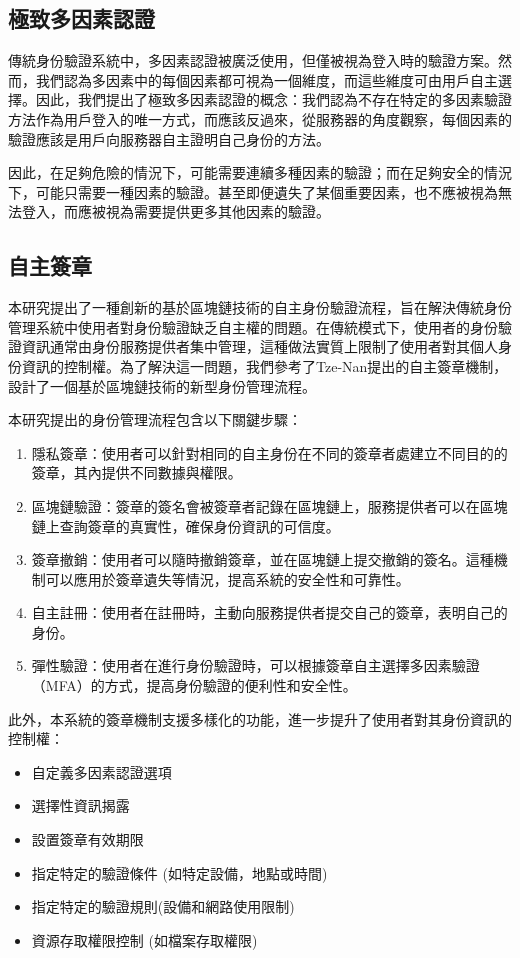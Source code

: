 \subsection{極致多因素認證}
傳統身份驗證系統中，多因素認證被廣泛使用，但僅被視為登入時的驗證方案。然而，我們認為多因素中的每個因素都可視為一個維度，而這些維度可由用戶自主選擇。因此，我們提出了極致多因素認證的概念：我們認為不存在特定的多因素驗證方法作為用戶登入的唯一方式，而應該反過來，從服務器的角度觀察，每個因素的驗證應該是用戶向服務器自主證明自己身份的方法。

因此，在足夠危險的情況下，可能需要連續多種因素的驗證；而在足夠安全的情況下，可能只需要一種因素的驗證。甚至即便遺失了某個重要因素，也不應被視為無法登入，而應被視為需要提供更多其他因素的驗證。
\subsection{自主簽章}
本研究提出了一種創新的基於區塊鏈技術的自主身份驗證流程，旨在解決傳統身份管理系統中使用者對身份驗證缺乏自主權的問題。在傳統模式下，使用者的身份驗證資訊通常由身份服務提供者集中管理，這種做法實質上限制了使用者對其個人身份資訊的控制權。為了解決這一問題，我們參考了Tze-Nan\cite{NTU202102846}提出的自主簽章機制，設計了一個基於區塊鏈技術的新型身份管理流程。

本研究提出的身份管理流程包含以下關鍵步驟：
\begin{enumerate}
  \item 隱私簽章：使用者可以針對相同的自主身份在不同的簽章者處建立不同目的的簽章，其內提供不同數據與權限。
  \item 區塊鏈驗證：簽章的簽名會被簽章者記錄在區塊鏈上，服務提供者可以在區塊鏈上查詢簽章的真實性，確保身份資訊的可信度。
  \item 簽章撤銷：使用者可以隨時撤銷簽章，並在區塊鏈上提交撤銷的簽名。這種機制可以應用於簽章遺失等情況，提高系統的安全性和可靠性。
  \item 自主註冊：使用者在註冊時，主動向服務提供者提交自己的簽章，表明自己的身份。
  \item 彈性驗證：使用者在進行身份驗證時，可以根據簽章自主選擇多因素驗證（MFA）的方式，提高身份驗證的便利性和安全性。
\end{enumerate}
此外，本系統的簽章機制支援多樣化的功能，進一步提升了使用者對其身份資訊的控制權：
\begin{itemize}
  \item 自定義多因素認證選項
  \item 選擇性資訊揭露
  \item 設置簽章有效期限
  \item 指定特定的驗證條件 (如特定設備，地點或時間)
  \item 指定特定的驗證規則(設備和網路使用限制)
  \item 資源存取權限控制 (如檔案存取權限)
\end{itemize}

